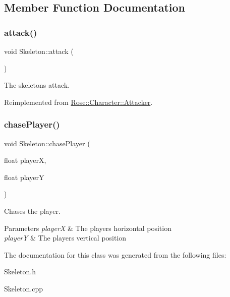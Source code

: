 \subsection{Member Function Documentation}
\mbox{\label{classSkeleton_a90927f96174510cebe29d6bb39f4387c}} 
\subsubsection{\texorpdfstring{attack()}{attack()}}
{\footnotesize\ttfamily void Skeleton\+::attack (\begin{DoxyParamCaption}{ }\end{DoxyParamCaption})\hspace{0.3cm}{\ttfamily [virtual]}}



The skeletons attack. 



Reimplemented from \mbox{\hyperlink{classRose_1_1Character_1_1Attacker_a49ee8dfa04018f90c7fd5fa20ba4fcad}{Rose\+::\+Character\+::\+Attacker}}.

\mbox{\label{classSkeleton_aefa4683beb507bafaa2b20eaba4f478d}} 
\subsubsection{\texorpdfstring{chasePlayer()}{chasePlayer()}}
{\footnotesize\ttfamily void Skeleton\+::chase\+Player (\begin{DoxyParamCaption}\item[{float}]{playerX,  }\item[{float}]{playerY }\end{DoxyParamCaption})}



Chases the player. 


\begin{DoxyParams}{Parameters}
{\em playerX} & The players horizontal position \\
\hline
{\em playerY} & The players vertical position \\
\hline
\end{DoxyParams}


The documentation for this class was generated from the following files\+:\begin{DoxyCompactItemize}
\item 
Skeleton.\+h\item 
Skeleton.\+cpp\end{DoxyCompactItemize}
